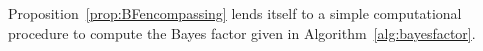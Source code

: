 Proposition~\ref{prop:BFencompassing} lends itself to a simple computational procedure to compute the Bayes factor given in Algorithm~\ref{alg:bayesfactor}.

    
